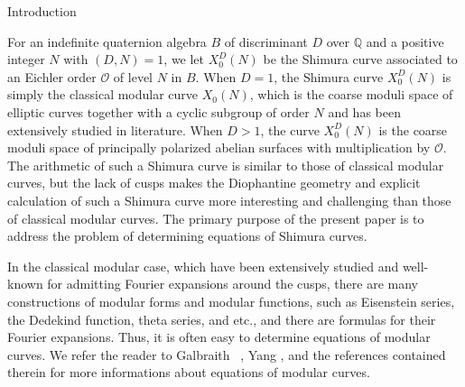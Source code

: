 \documentclass{amsart}
\theoremstyle{definition}
\def\O{\mathcal O}
\def\Q{\mathbb Q}
\begin{document}
\begin{section}{Introduction}

For an indefinite quaternion algebra $B$ of discriminant $D$ over $\Q$
and a positive integer $N$ with $(D,N)=1$, we let $X_0^D(N)$ be
the Shimura curve associated to an Eichler order $\O$ of level $N$ in
$B$. When $D=1$, the Shimura curve $X_0^D(N)$ is simply the classical
modular curve $X_0(N)$, which is the coarse moduli space of elliptic
curves together with a cyclic subgroup of order $N$ and has been
extensively studied in literature. When $D>1$, the curve $X_0^D(N)$ is
the coarse moduli space of principally polarized abelian surfaces with
multiplication by $\O$. The arithmetic of such a Shimura curve is
similar to those of classical modular curves, but the lack of cusps makes the
Diophantine geometry and explicit calculation of such a Shimura curve
more interesting and challenging than those of classical modular
curves. The primary purpose of the present paper is to address the
problem of determining equations of Shimura curves.

In the classical modular case, which have been extensively studied and
well-known for admitting Fourier expansions around the cusps, there
are many constructions of modular forms and modular functions,
such as Eisenstein series, the Dedekind function, theta series, and
etc., and there are formulas for their Fourier expansions. Thus, it is
often easy to determine equations of modular curves. We refer the
reader to Galbraith {~\cite{Galbraith}}, Yang \cite{Yang-AIM}, and the
references contained therein for more informations about equations of modular
curves.


\end{section}
\end{document}
